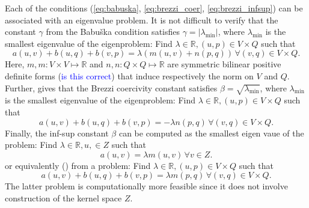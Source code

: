 \documentclass[a4paper,10pt]{article}
\newcommand{\R}{\ensuremath{\mathbb{R}}}
\newcommand{\ASK}[1]{\textcolor{blue}{#1}}
\begin{document}
  Each of the conditions (\ref{eq:babuska}, \ref{eq:brezzi_coer},
  \ref{eq:brezzi_infsup}) can be associated with
  an eigenvalue problem. It is not difficult to verify that the constant $\gamma$
  from the Babu\v ska condition satisfies $\gamma=\left|\lambda_{\text{min}}\right|$, where
  $\lambda_\text{min}$ is the smallest eigenvalue of the eigenproblem: Find
  $\lambda\in\R, (u, p) \in V\times Q$ such that
  \begin{equation}
    a(u, v) + b(u, q) + b(v, p) = \lambda\left(m(u, v) + n(p, q)\right)\,\forall
    (v, q) \in V\times Q.
  \end{equation}
  Here, $m, m:V\times V\mapsto\R$ and $n, n:Q\times Q\mapsto\R$ are symmetric
  bilinear positive definite forms (\ASK{is this correct}) that induce
  respectively the norm on $V$ and $Q$. Further, \cite{qin} gives that the Brezzi
  coercivity constant satisfies $\beta=\sqrt{\lambda_{\text{min}}}$, where 
  $\lambda_\text{min}$ is the smallest eigenvalue of the eigenproblem: Find
  $\lambda\in\R, (u, p) \in V\times Q$ such that
  \begin{equation}
    a(u, v) + b(u, q) + b(v, p) = -\lambda n(p, q)\,\forall(v, q) \in V\times Q.
  \end{equation}
  Finally, the inf-sup constant $\beta$ can be computed as the smallest eigen
  vaue of the problem: Find $\lambda\in\R, u, \in Z$ such that
  \begin{equation}
    a(u, v) = \lambda m(u, v)\,\forall v \in Z.
  \end{equation}
  or equivalently (\cite{rognes}) from a problem: Find
  $\lambda\in\R, (u, p) \in V\times Q$ such that
  \begin{equation}
    a(u, v) + b(u, q) + b(v, p) = \lambda m(p, q)\,\forall(v, q) \in V\times Q.
  \end{equation}
  The latter problem is computationally more feasible since it does not involve
  construction of the kernel space $Z$.
\end{document}
